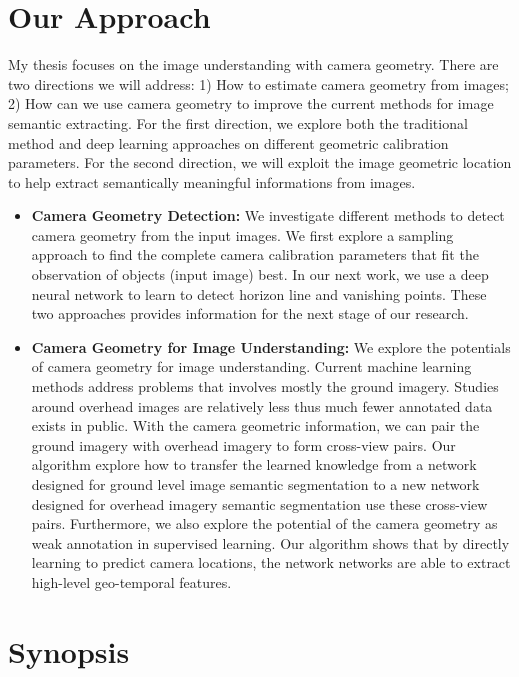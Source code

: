 \section{Our Approach}
My thesis focuses on the image understanding with camera geometry.
There are two directions we will address: 1) How to estimate camera
geometry from images; 2) How can we use camera geometry to improve the
current methods for image semantic extracting. For the first direction,
we explore both the traditional method and deep learning approaches on
different geometric calibration parameters. For the second direction,
we will exploit the image geometric location to help extract
semantically meaningful informations from images.

\begin{itemize}[noitemsep]

  \item \textbf{Camera Geometry Detection:} 
  We investigate different methods to detect camera geometry from the
  input images. We first explore a sampling approach to find the
  complete camera calibration parameters that fit the observation of
  objects (input image) best. In our next work, we use a deep neural
  network to learn to detect horizon line and vanishing points. These
  two approaches provides information for the next stage of our
  research.

  \item \textbf{Camera Geometry for Image Understanding:}
  We explore the potentials of camera geometry for image understanding.
  Current machine learning methods address problems that involves mostly
  the ground imagery. 
  Studies around overhead images are relatively less thus much fewer
  annotated data exists in public. With the camera geometric
  information, we can pair the ground imagery with overhead imagery to
  form cross-view pairs. Our algorithm explore how to transfer the
  learned knowledge from a network designed for ground level image
  semantic segmentation to a new network designed for overhead imagery
  semantic segmentation use these cross-view pairs.
  Furthermore, we also explore the potential of the camera geometry as
  weak annotation in supervised learning. Our algorithm shows that by
  directly learning to predict camera locations, the network networks
  are able to extract high-level geo-temporal features.

\end{itemize}


\section{Synopsis}

